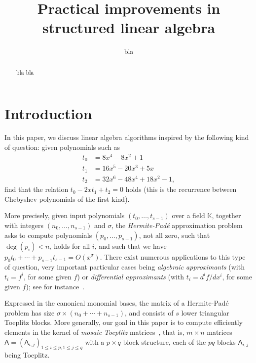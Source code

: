 \documentclass{sig-alternate}
\author{
\alignauthor
bla
\affaddr{blu} \\
\affaddr{bli}
\email{blo@ble}
}
\title{Practical improvements in structured linear algebra}
\newcommand{\mA}{\ensuremath{\mathsf{A}}}
\newcommand{\K}{\ensuremath{\mathbb{K}}}
\begin{document}
\maketitle

\begin{abstract}
bla bla
\end{abstract}


\section{Introduction}

In this paper, we discuss linear algebra algorithms inspired by the
following kind of question: given polynomials such as
\begin{align*}
t_0 &= 8x^4 - 8x^2 + 1\\
t_1 &= 16x^5 - 20x^3 + 5x\\
t_2 &= 32x^6 - 48x^4 + 18x^2 - 1,
\end{align*}
find that the relation $t_0-2x t_1+t_2=0$ holds (this is the
recurrence between Chebyshev polynomials of the first kind).  

More precisely, given input polynomials $(t_0,\dots,t_{s-1})$ over a
field $\K$, together with integers $(n_0,\dots,n_{s-1})$ and $\sigma$,
the {\em Hermite-Pad\'e} approximation problem asks to compute
polynomials $(p_0,\dots,p_{s-1})$, not all zero, such that $\deg(p_i)
< n_i$ holds for all $i$, and such that we have $p_0 t_0 + \cdots +
p_{s-1} t_{s-1}=O(x^\sigma)$. There exist numerous applications to
this type of question, very important particular cases being {\em
  algebraic approximants} (with $t_i =f^i$, for some given $f$) or
{\em differential approximants} (with $t_i =d^if/dx^i$, for some given
$f$); see for instance~\cite[Chapitre~7]{BoChGiLeLeSaSc17}.

Expressed in the canonical monomial bases, the matrix of a
Hermite-Pad\'e problem has size $\sigma \times (n_0 + \cdots +
n_{s-1})$, and consists of $s$ lower triangular Toeplitz blocks. More
generally, our goal in this paper is to compute efficiently elements
in the kernel of {\em mosaic Toeplitz} matrices~\cite{HeAm88}, that
is, $m \times n$ matrices $\mA=(\mA_{i,j})_{1 \le i \le p,1 \le j \le
  q}$ with a $p \times q$ block structure, each of the $pq$ blocks $\mA_{i,j}$
being Toeplitz.
\end{document}
